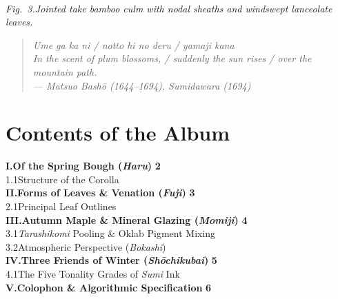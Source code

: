 \documentclass[11pt,a4paper,twoside]{article}
\begin{document}
\medskip
\begin{center}
\kachospray[width=0.80\linewidth, height=32mm, motif=bamboo, seed=31, from=left]\\[3pt]
{\small\itshape Fig.~3.\quad Jointed \emph{take} bamboo culm with nodal sheaths and windswept lanceolate leaves.}
\end{center}
\medskip

\begin{quote}
\itshape
Ume ga ka ni / notto hi no deru / yamaji kana\\[2pt]
In the scent of plum blossoms, / suddenly the sun rises / over the mountain path.\\[2pt]
\upshape\small --- Matsuo Bash\=o (1644--1694), \emph{Sumidawara} (1694)
\end{quote}

\clearpage

\section*{Contents of the Album}

\vspace{2pt}
\noindent\textbf{I.\quad Of the Spring Bough (\emph{Haru})} \dotfill \textbf{2}\\[2pt]
\hspace*{1.8em}1.1\quad Structure of the Corolla \\[6pt]
\noindent\textbf{II.\quad Forms of Leaves \& Venation (\emph{Fuji})} \dotfill \textbf{3}\\[2pt]
\hspace*{1.8em}2.1\quad Principal Leaf Outlines \\[6pt]
\noindent\textbf{III.\quad Autumn Maple \& Mineral Glazing (\emph{Momiji})} \dotfill \textbf{4}\\[2pt]
\hspace*{1.8em}3.1\quad \emph{Tarashikomi} Pooling \& Oklab Pigment Mixing \\[2pt]
\hspace*{1.8em}3.2\quad Atmospheric Perspective (\emph{Bokashi}) \\[6pt]
\noindent\textbf{IV.\quad Three Friends of Winter (\emph{Sh\=ochikubai})} \dotfill \textbf{5}\\[2pt]
\hspace*{1.8em}4.1\quad The Five Tonality Grades of \emph{Sumi} Ink \\[6pt]
\noindent\textbf{V.\quad Colophon \& Algorithmic Specification} \dotfill \textbf{6}
\end{document}
